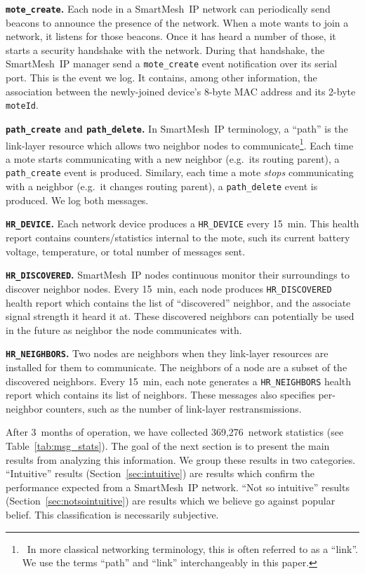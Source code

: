 \documentclass{sig-alternate}
\newcommand{\smip}                {SmartMesh~IP\xspace}
\newcommand{\HRNEIGHBORS}         {{\tt HR\_NEIGHBORS}\xspace}
\newcommand{\HRDISCOVERED}        {{\tt HR\_DISCOVERED}\xspace}
\newcommand{\HRDEVICE}            {{\tt HR\_DEVICE}\xspace}
\newcommand{\pathcreate}          {{\tt path\_create}\xspace}
\newcommand{\pathdelete}          {{\tt path\_delete}\xspace}
\newcommand{\motecreate}          {{\tt mote\_create}\xspace}
\newcommand{\moteId}              {{\tt moteId}\xspace}
\begin{document}
\textbf{\motecreate.}
Each node in a \smip network can periodically send beacons to announce the presence of the network.
When a mote wants to join a network, it listens for those beacons.
Once it has heard a number of those, it starts a security handshake with the network.
During that handshake, the \smip manager send a \motecreate event notification over its serial port.
This is the event we log.
It contains, among other information, the association between the newly-joined device's 8-byte MAC address and its 2-byte \moteId.

\textbf{\pathcreate and \pathdelete.}
In \smip terminology, a ``path'' is the link-layer resource which allows two neighbor nodes to communicate\footnote{~In more classical networking terminology, this is often referred to as a ``link''. We use the terms ``path'' and ``link'' interchangeably in this paper.}.
Each time a mote starts communicating with a new neighbor (e.g.~its routing parent), a \pathcreate event is produced.
Similary, each time a mote \textit{stops} communicating with a neighbor (e.g.~it changes routing parent), a \pathdelete event is produced.
We log both messages.

\textbf{\HRDEVICE.}
Each network device produces a \HRDEVICE every 15~min.
This health report contains counters/statistics internal to the mote, such its current battery voltage, temperature, or total number of messages sent.

\textbf{\HRDISCOVERED.}
\smip nodes continuous monitor their surroundings to discover neighbor nodes.
Every 15~min, each node produces \HRDISCOVERED health report which contains the list of ``discovered'' neighbor, and the associate signal strength it heard it at.
These discovered neighbors can potentially be used in the future as neighbor the node communicates with.

\textbf{\HRNEIGHBORS.}
Two nodes are neighbors when they link-layer resources are installed for them to communicate.
The neighbors of a node are a subset of the discovered neighbors.
Every 15~min, each note generates a \HRNEIGHBORS health report which contains its list of neighbors.
These messages also specifies per-neighbor counters, such as the number of link-layer restransmissions.


After 3~months of operation, we have collected 369,276~network statistics (see Table~\ref{tab:msg_stats}).
The goal of the next section is to present the main results from analyzing this information.
We group these results in two categories.
``Intuitive'' results (Section~\ref{sec:intuitive}) are results which confirm the performance expected from a \smip network.
``Not so intuitive'' results (Section~\ref{sec:notsointuitive}) are results which we believe go against popular belief.
This classification is necessarily subjective.
\end{document}
